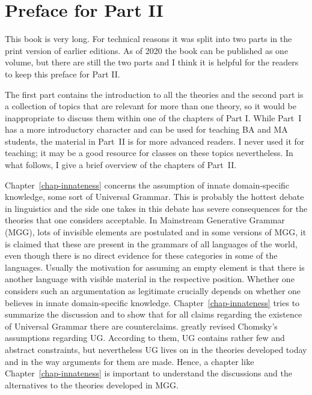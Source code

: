
\chapter*{Preface for Part II}

This book is very long. For technical reasons it was split into two parts in the print version of
earlier editions. As of 2020 the book can be published as one volume, but there are still the two
parts and I think it is helpful for the readers to keep this preface for Part II.

The first part contains the introduction to all the theories and the second part is a collection of
topics that are relevant for more than one theory, so it would be inappropriate to discuss them
within one of the chapters of Part I. While Part~I has a more introductory character and can be used
for teaching BA and MA students, the material in Part~II is for more advanced readers. I never used
it for teaching; it may be a good resource for classes on these topics nevertheless. In what follows, I
give a brief overview of the chapters of Part~II.

Chapter~\ref{chap-innateness} concerns the assumption of
innate domain-specific knowledge, some sort of Universal Grammar. This is probably the hottest
debate in linguistics and the side one takes in this debate has severe consequences for the theories
that one considers acceptable. In Mainstream Generative Grammar (MGG), lots of invisible elements are
postulated and in some versions of MGG, it is claimed that these are present in the grammars of all languages of the
world, even though there is no direct evidence for these categories in some of the languages. Usually the motivation for
assuming an empty element is that there is another language with visible material in the respective
position. Whether one considers such an argumentation as legitimate crucially depends on whether one
believes in innate domain-specific knowledge. Chapter~\ref{chap-innateness} tries to summarize the
discussion and to show that for all claims regarding the existence of Universal Grammar there are
counterclaims. \citet*{HCF2002a} greatly revised Chomsky's assumptions regarding UG. According to them,
UG contains rather few and abstract constraints, but nevertheless UG lives on in the theories
developed today and in the way arguments for them are made. Hence, a chapter like
Chapter~\ref{chap-innateness} is important to understand the discussions and the alternatives to the
theories developed in MGG.

